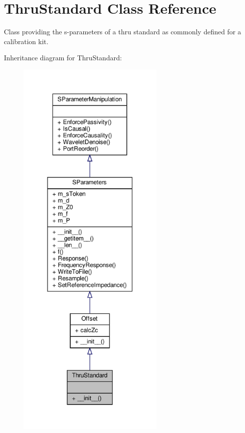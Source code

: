 \hypertarget{classSignalIntegrity_1_1Measurement_1_1CalKit_1_1Standards_1_1ThruStandard_1_1ThruStandard}{}\section{Thru\+Standard Class Reference}
\label{classSignalIntegrity_1_1Measurement_1_1CalKit_1_1Standards_1_1ThruStandard_1_1ThruStandard}


Class providing the s-\/parameters of a thru standard as commonly defined for a calibration kit.  




Inheritance diagram for Thru\+Standard\+:\nopagebreak
\begin{figure}[H]
\begin{center}
\leavevmode
\includegraphics[height=550pt]{classSignalIntegrity_1_1Measurement_1_1CalKit_1_1Standards_1_1ThruStandard_1_1ThruStandard__inherit__graph}
\end{center}
\end{figure}


